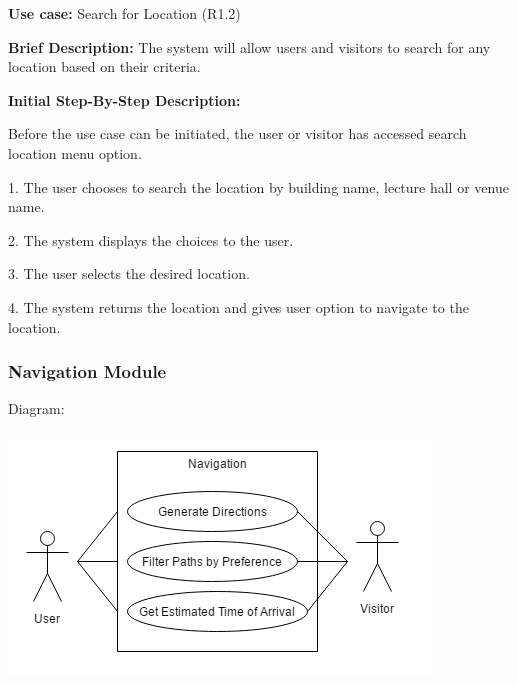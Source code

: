 \documentclass{article}
\begin{document}
\begin{flushleft}
    \textbf{Use case:} Search for Location (R1.2)
    \newline
    	
    \textbf{Brief Description:}
    \newline
    The system will allow users and visitors to search for any location based on their criteria.
    \newline
    
    \textbf{Initial Step-By-Step Description:}
    
    Before the use case can be initiated, the user or visitor has accessed search location menu option.
	\newline    
	
1. The user chooses to search the location by building name, lecture hall or venue name.

2. The system displays the choices to the user.

3. The user selects the desired location.

4. The system returns the location and gives user option to navigate to the location.
\end{flushleft}

\subsubsection{Navigation Module}
    Diagram:
    
    \includegraphics[scale=.7]{Navigation}
    
\end{document}
